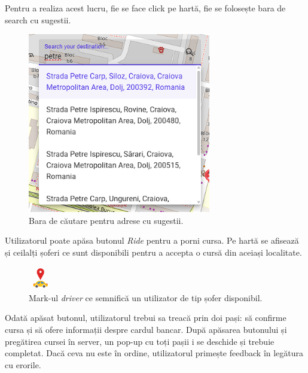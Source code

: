 Pentru a realiza acest lucru, fie se face click pe hartă, fie se folosește bara de search cu sugestii.

\begin{figure}[H]
    \centering
    \includegraphics[width=8cm]{Assets/search.png}
    \caption{Bara de căutare pentru adrese cu sugestii.}
    \label{fig:searchAddress}
\end{figure}

Utilizatorul poate apăsa butonul \textit{Ride} pentru a porni cursa.
Pe hartă se afisează și ceilalți șoferi ce sunt disponibili pentru a accepta o cursă din aceiași localitate.

\begin{figure}[H]
    \centering
    \includegraphics[width=1cm]{Assets/driver.png}
    \caption{Mark-ul \textit{driver} ce semnifică un utilizator de tip șofer disponibil.}
    \label{fig:driverPin}
\end{figure}

Odată apăsat butonul, utilizatorul trebui sa treacă prin doi pași: să confirme cursa și să ofere informații despre cardul bancar. 
După apăsarea butonului și pregătirea cursei în server, un pop-up 
cu toți pașii i se deschide și trebuie completat. Dacă ceva nu este în ordine, utilizatorul primește
feedback în legătura cu erorile.

